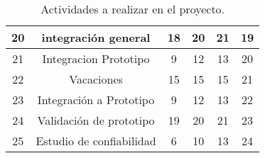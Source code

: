 \begin{table}[H]
\begin{tabular}{|c|c|c|c|c|c|}
20          & integración general                     & 18                          & 20                & 21                          & 19                                        \\ \hline
21          & Integracion Prototipo                   & 9                           & 12                & 13                          & 20                                        \\ \hline
22          & Vacaciones                              & 15                          & 15                & 15                          & 21                                        \\ \hline
23          & Integración a Prototipo                 & 9                           & 12                & 13                          & 22                                        \\ \hline
24          & Validación de prototipo                 & 19                          & 20                & 21                          & 23                                        \\ \hline
25          & Estudio de confiabilidad                & 6                           & 10                & 13                          & 24                                        \\ \hline
\end{tabular}
\caption{Actividades a realizar en el proyecto.}
\label{tab:tareas}
\end{table}








